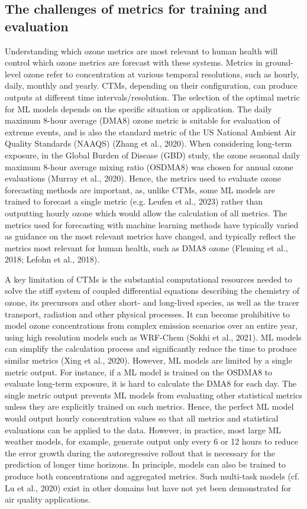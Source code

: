 \documentclass[gmd, manuscript]{copernicus}
\begin{document}
\subsection{The challenges of metrics for training and evaluation}
Understanding which ozone metrics are most relevant to human health will control which ozone metrics are forecast with these systems. Metrics in ground-level ozone refer to concentration at various temporal resolutions, such as hourly, daily, monthly and yearly. CTMs, depending on their configuration, can produce outputs at different time intervals/resolution. The selection of the optimal metric for ML models depends on the specific situation or application. The daily maximum 8-hour average (DMA8) ozone metric is suitable for evaluation of extreme events, and is also the standard metric of the US National Ambient Air Quality Standards (NAAQS) (Zhang et al., 2020). When considering long-term exposure, in the Global Burden of Disease (GBD) study, the ozone seasonal daily maximum 8-hour average mixing ratio (OSDMA8) was chosen for annual ozone evaluations (Murray et al., 2020). Hence, the metrics used to evaluate ozone forecasting methods are important, as, unlike CTMs, some ML models are trained to forecast a single metric (e.g. Leufen et al., 2023) rather than outputting hourly ozone which would allow the calculation of all metrics. The metrics used for forecasting with machine learning methods have typically varied as guidance on the most relevant metrics have changed, and typically reflect the metrics most relevant for human health, such as DMA8 ozone (Fleming et al., 2018; Lefohn et al., 2018). 

A key limitation of CTMs is the substantial computational resources needed to solve the stiff system of coupled differential equations describing the chemistry of ozone, its precursors and other short- and long-lived species, as well as the tracer transport, radiation and other physical processes. It can become prohibitive to model ozone concentrations from complex emission scenarios over an entire year, using high resolution models such as WRF-Chem (Sokhi et al., 2021). ML models can simplify the calculation process and significantly reduce the time to produce similar metrics (Xing et al., 2020). However, ML models are limited by a single metric output. For instance, if a ML model is trained on the OSDMA8 to evaluate long-term exposure, it is hard to calculate the DMA8 for each day. The single metric output prevents ML models from evaluating other statistical metrics unless they are explicitly trained on such metrics. Hence, the perfect ML model would output hourly concentration values so that all metrics and statistical evaluations can be applied to the data. However, in practice, most large ML weather models, for example, generate output only every 6 or 12 hours to reduce the error growth during the autoregressive rollout that is necessary for the prediction of longer time horizons. In principle, models can also be trained to produce both concentrations and aggregated metrics. Such multi-task models (cf. Lu et al., 2020) exist in other domains but have not yet been demonstrated for air quality applications.
\end{document}
